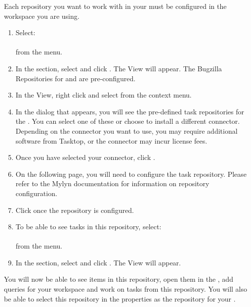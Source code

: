 Each repository you want to work with in your \ite{} must be configured in the workspace you are using. 

\begin{enumerate}
\item Select:\\ \\ from the menu.
\item In the  section, select  and click . The  View will appear. The Bugzilla Repositories for \gd{} and \jb{} are pre-configured.
\item In the  View, right click and select  from the context menu.
\item In the dialog that appears, you will see the pre-defined task repositories for the \ite{}. You can select one of these or choose to install a different connector. Depending on the connector you want to use, you may require additional software from Tasktop, or the connector may incur license fees.
\item Once you have selected your connector, click .
\item On the following page, you will need to configure the task repository. Please refer to the Mylyn documentation for information on repository configuration. 
\item Click  once the repository is configured.
\item To be able to see tasks in this repository, select: \\ \\ from the menu. 
\item In the  section, select  and click . The  View will appear.
\end{enumerate}

You will now be able to see items in this repository, open them in the \ite{}, add queries for your workspace and work on tasks from this repository. 
You will also be able to select this repository in the \gdproject{} properties as the repository for your \gdproject{} . 
